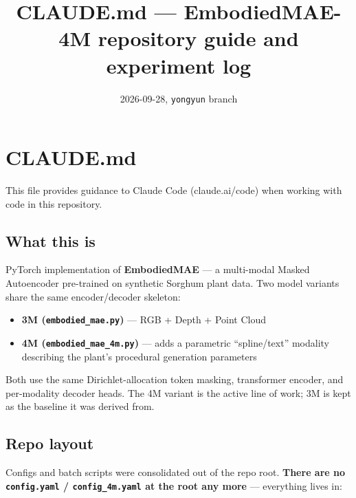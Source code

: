 \documentclass[
  10pt,
]{article}
\title{CLAUDE.md — EmbodiedMAE-4M repository guide and experiment log}
\author{}
\date{2026-09-28, \texttt{yongyun} branch}
\providecommand{\tightlist}{%
  \setlength{\itemsep}{0pt}\setlength{\parskip}{0pt}}
\begin{document}
\maketitle

{
\setcounter{tocdepth}{3}
\tableofcontents
}
\section{CLAUDE.md}\label{claude.md}

This file provides guidance to Claude Code (claude.ai/code) when working
with code in this repository.

\subsection{What this is}\label{what-this-is}

PyTorch implementation of \textbf{EmbodiedMAE} --- a multi-modal Masked
Autoencoder pre-trained on synthetic Sorghum plant data. Two model
variants share the same encoder/decoder skeleton:

\begin{itemize}
\tightlist
\item
  \textbf{3M (\texttt{embodied\_mae.py})} --- RGB + Depth + Point Cloud
\item
  \textbf{4M (\texttt{embodied\_mae\_4m.py})} --- adds a parametric
  ``spline/text'' modality describing the plant's procedural generation
  parameters
\end{itemize}

Both use the same Dirichlet-allocation token masking, transformer
encoder, and per-modality decoder heads. The 4M variant is the active
line of work; 3M is kept as the baseline it was derived from.

\subsection{Repo layout}\label{repo-layout}

Configs and batch scripts were consolidated out of the repo root.
\textbf{There are no \texttt{config.yaml} / \texttt{config\_4m.yaml} at
the root any more} --- everything lives in:
\end{document}
